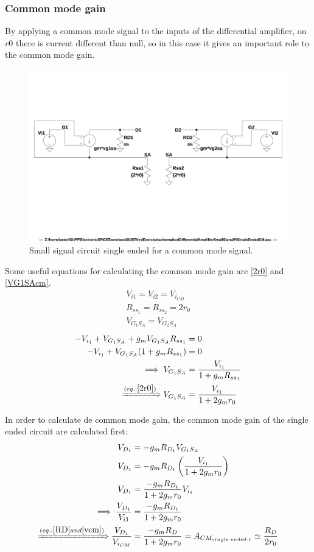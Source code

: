 \documentclass[10pt,a4paper]{book}
\begin{document}
\subsubsection{Common mode gain}
By applying a common mode signal to the inputs of the differential amplifier, on $r0$ there is current different than null, so in this case it gives an important role to the common mode gain.\\
\begin{figure}[h]
  \centering
  \includegraphics[width=12cm]{schematics/DifferentialAmplifierSmallSignalPiSingleEndedCM.jpg}
  \caption{Small signal circuit single ended for a common mode signal.}
  \label{PiSingle2}
\end{figure}
Some useful equations for calculating the common mode gain are \ref{2r0} and \ref{VG1SAcm}.\\
\begin{align}
V_{i1} = V_{i2} = V_{i_{CM}} \label{vcm}\\
R_{ss_1} = R_{ss_2} = 2 r_0 \label{2r0}\\
V_{G_1S_A} = V_{G_2S_A}
\end{align}
\begin{align}
-V_{i_1} + V_{G_1S_A} + g_m V_{G_1S_A} R_{ss_1} &= 0\\
-V_{i_1} + V_{G_1S_A} (1+g_m R_{ss_1}) &= 0\\
\implies V_{G_1S_A} &= \frac{V_{i_1}}{1+g_m R_{ss_1}}\\ \xRightarrow{(eq.: \ref{2r0})}
V_{G_1S_A} &= \frac{V_{i_1}}{1+2g_m r_0}\label{VG1SAcm}
\end{align}

In order to calculate de common mode gain, the common mode gain of the single ended circuit are calculated first:\\
\begin{align}
V_{D_1} &= -g_m R_{D_1}V_{G_1S_A}\\
V_{D_1} &= -g_m R_{D_1} \left(\frac{V_{i_1}}{1+2g_m r_0} \right)\\
V_{D_1} &= \frac{-g_m R_{D_1}}{1+2g_m r_0}V_{i_1}\\
\implies \frac{V_{D_1}}{V_{i1}} &= \frac{-g_m R_{D_1}}{1+2g_m r_0}\\
\xRightarrow{(eq.: \ref{RD} and \ref{vcm})} \frac{V_{D_1}}{V_{i_{CM}}} &= \frac{-g_m R_{D}}{1+2g_m r_0} = A_{CM_{single\cdot ended\cdot 1}} \simeq \frac{R_{D}}{2r_0}
\end{align}
\end{document}
